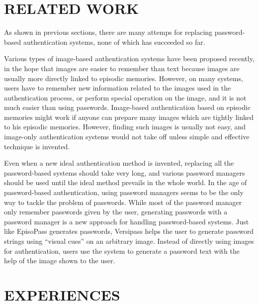 \documentclass{sigchi}
\begin{document}
\section{RELATED WORK}

As shown in previous sections,
there are many attemps for replacing password-based authentication systems,
none of which has succeeded so far.

Various types of image-based authentication systems have been proposed recently,
in the hope that images are easier to remember than text
because images are usually more directly linked to episodic memories.
However, on many systems,
users have to remember new information related to the images
used in the authentication process, or
perform special operation on the image, and
it is not much easier than using passwords.
%
Image-based authentication based on episodic memories might work
if anyone can prepare many images 
which are tightly linked to his episodic memories.
However, finding such images is usually not easy, and
image-only authentication systems would not take off
unless simple and effective technique is invented.

Even when a new ideal authentication method is invented,
replacing all the password-based systems should take very long, and
various password managers should be used until the ideal method
prevails in the whole world.
In the age of password-based authentication,
using password managers seems to be the only way to tackle
the problem of passwords.
%
While most of the password manager only remember passwords given by the user,
generating passwords with a password manager is a new approach for
handling password-based systems.
Just like EpisoPass generates passwords,
Versipass\cite{Stobert:2014:PMD:2683467.2683471}%
helps the user to generate password strings
using ``visual cues'' on an arbitrary image.
Instead of directly using images for authentication,
users use the system to generate a password text with the help of
the image shown to the user.

% 
% 
% 
% 
% 
%

\section{EXPERIENCES}
\end{document}
